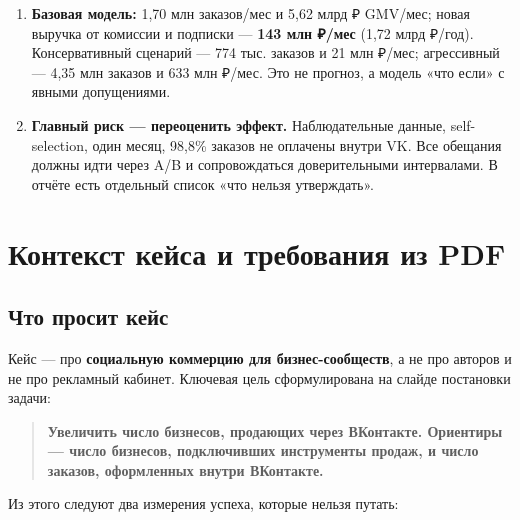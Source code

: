 \documentclass[10pt,a4paper]{article}
\begin{document}
\begin{enumerate}[leftmargin=1.35em,itemsep=2pt,topsep=3pt,parsep=0pt]
\item \textbf{Базовая модель:} 1,70 млн заказов/мес и 5,62 млрд ₽ GMV/мес; новая выручка от комиссии и подписки — \textbf{143 млн ₽/мес} (1,72 млрд ₽/год). Консервативный сценарий — 774 тыс. заказов и 21 млн ₽/мес; агрессивный — 4,35 млн заказов и 633 млн ₽/мес. Это не прогноз, а модель «что если» с явными допущениями.
\item \textbf{Главный риск — переоценить эффект.} Наблюдательные данные, self-selection, один месяц, 98,8\% заказов не оплачены внутри VK. Все обещания должны идти через A/B и сопровождаться доверительными интервалами. В отчёте есть отдельный список «что нельзя утверждать».
\end{enumerate}

\clearpage

\section{Контекст кейса и требования из PDF}

\subsection{Что просит кейс}

Кейс — про \textbf{социальную коммерцию для бизнес-сообществ}, а не про авторов и не про рекламный кабинет. Ключевая цель сформулирована на слайде постановки задачи:\par

\begin{quote}
\noindent\colorbox{soft}{\parbox{\dimexpr\linewidth-2\fboxsep}{
\raggedright \textbf{Увеличить число бизнесов, продающих через ВКонтакте. Ориентиры — число бизнесов, подключивших инструменты продаж, и число заказов, оформленных внутри ВКонтакте.}
}}
\end{quote}
\vspace{2pt}

Из этого следуют два измерения успеха, которые нельзя путать:\par
\end{document}
